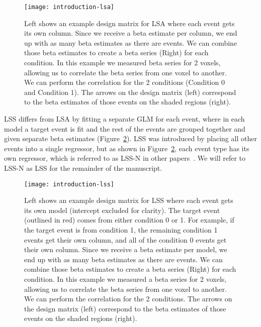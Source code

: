 \documentclass[phd,figures,tables,ackpage,abstractpage,publicabstractpage]{uithesis}
\begin{document}
\begin{figure}[H]
  \centering
  \texttt{[image: introduction-lsa]}
  \caption[Example LSA design matrix and analysis]{
    Left shows an example design matrix for LSA where each event gets its own column.
    Since we receive a beta estimate per column, we end up with as many beta estimates as there
    are events.
    We can combine those beta estimates to create a beta series (Right) for each condition.
    In this example we measured beta series for 2 voxels, allowing us to
    correlate the beta series from one voxel to another.
    We can perform the correlation for the 2 conditions (Condition 0 and Condition 1).
    The arrows on the design matrix (left) correspond to the beta estimates of those events
    on the shaded regions (right).
  }
  \label{fig:introlsa}
\end{figure}

LSS differs from LSA by fitting a separate GLM for each event, where in each model a target
event is fit and the rest of the events are grouped together and given separate beta estimates (Figure~\ref{fig:introlss}).
LSS was introduced by placing all other events into a single regressor, but as shown in Figure~\ref{fig:introlss},
each event type has its own regressor, which is referred to as LSS-N in other papers~\cite{Rissman2004,Abdulrahman2016,Mumford2012}.
We will refer to LSS-N as LSS for the remainder of the manuscript.

\begin{figure}[H]
  \centering
  \texttt{[image: introduction-lss]}
  \caption[Example LSS design matrix and analysis]{
    Left shows an example design matrix for LSS where each event gets its own model
    (intercept excluded for clarity).
    The target event (outlined in red) comes from either condition 0 or 1.
    For example, if the target event is from condition 1, the remaining condition 1 events
    get their own column, and all of the condition 0 events get their own column.
    Since we receive a beta estimate per model, we end up with as many beta estimates as there
    are events.
    We can combine those beta estimates to create a beta series (Right) for each condition.
    In this example we measured a beta series for 2 voxels, allowing us to
    correlate the beta series from one voxel to another.
    We can perform the correlation for the 2 conditions.
    The arrows on the design matrix (left) correspond to the beta estimates of those events
    on the shaded regions (right).
  }
  \label{fig:introlss}
\end{figure}
\end{document}
